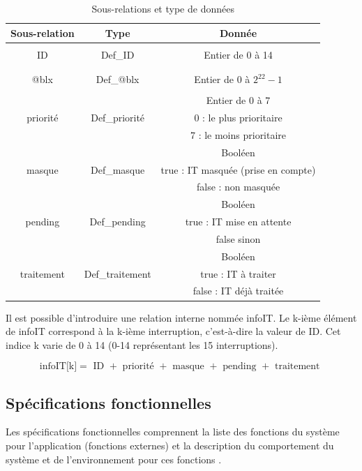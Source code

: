 \begin{table}[H]
	\centering
	\begin{tabular}{|c|c|c|}
		\hline
		Sous-relation & Type & Donnée \\
		\hline
		& & \\
		ID & Def\_ID & Entier de 0 à 14\\
		& & \\
		\hline
		& & \\
		@blx & Def\_@blx & Entier de 0 à $2^{22}-1$\\
		& & \\
		\hline
		& & Entier de 0 à 7\\
		priorité & Def\_priorité & 0 : le plus prioritaire\\
		& & 7 : le moins prioritaire\\
		\hline
		& & Booléen\\
		masque & Def\_masque & true : IT masquée (prise en compte)\\
		& & false : non masquée\\
		\hline
		& & Booléen\\
		pending & Def\_pending & true : IT mise en attente\\
		& & false sinon\\
		\hline
		& & Booléen\\
		traitement & Def\_traitement & true : IT à traiter\\
		& & false : IT déjà traitée\\
		\hline
	\end{tabular}
	\caption{Sous-relations et type de données}
	\label{tab:sous-relation}
\end{table}

Il est possible d'introduire une relation interne nommée infoIT. Le k-ième élément de infoIT correspond à la k-ième interruption, c'est-à-dire la valeur de ID. Cet indice k varie de 0 à 14 (0-14 représentant les 15 interruptions).

\begin{equation*}
	\mbox{infoIT[k]} = \mbox{ ID } + \mbox{ priorité } + \mbox{ masque } + \mbox{ pending } + \mbox{ traitement }
\end{equation*}

\newpage

\subsection{Spécifications fonctionnelles}
Les spécifications fonctionnelles comprennent la liste des fonctions du système
pour l'application (fonctions externes) et la description du comportement du système et
de l'environnement pour ces fonctions \cite{Calvez_2}.

